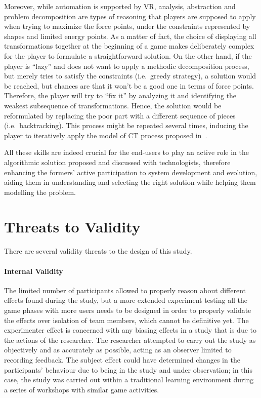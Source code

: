 Moreover, while automation is supported by \ac{VR}, analysis, abstraction and problem decomposition are types of reasoning that players are supposed to apply when trying to maximize the force points, under the constraints represented by shapes and limited energy points. As a matter of fact, the choice of displaying all transformations together at the beginning of a game makes deliberately complex for the player to formulate a straightforward solution. On the other hand, if the player is ``lazy'' and does not want to apply a methodic decomposition process, but merely tries to satisfy the constraints (i.e.\ greedy strategy), a solution would be reached, but chances are that it won't be a good one in terms of force points. Therefore, the player will try to ``fix it'' by analyzing it and identifying the weakest subsequence of transformations. Hence, the solution would be reformulated by replacing the poor part with a different sequence of pieces (i.e.\ backtracking). This process might be repeated several times, inducing the player to iteratively apply the model of \ac{CT} process proposed in~\cite{Repenning:fy}.

All these skills are indeed crucial for the end-users to play an active role in the algorithmic solution proposed and discussed with technologists, therefore enhancing the formers' active participation to system development and evolution, aiding them in understanding and selecting the right solution while helping them modelling the problem.

\section{Threats to Validity}
There are several validity threats to the design of this study.

\paragraph{Internal Validity} The limited number of participants allowed to properly reason about different effects found during the study, but a more extended experiment testing all the game phases with more users needs to be designed in order to properly validate the effects over isolation of team members, which cannot be definitive yet. The experimenter effect is concerned with any biasing effects in a study that is due to the actions of the researcher. The researcher attempted to carry out the study as objectively and as accurately as possible, acting as an observer limited to recording feedback. The subject effect could have determined changes in the participants' behaviour due to being in the study and under observation; in this case, the study was carried out within a traditional learning environment during a series of workshops with similar game activities.

